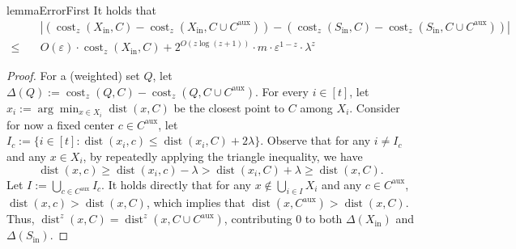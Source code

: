 \documentclass[letterpaper,11pt]{article}
\theoremstyle{plain}
\theoremstyle{definition}
\theoremstyle{remark}
\DeclareMathOperator{\cost}{cost}
\DeclareMathOperator{\dist}{dist}
\newcommand{\inl}{\mathrm{in}}
\newcommand{\eps}{\varepsilon}
\newcommand{\aux}{\mathrm{aux}}
\begin{document}
\begin{restatable}{lemma}{ErrorFirst}
    \label{lem:error first}
    It holds that 
    \begin{align*}
        &\quad \left|\left(\cost_z(X_\inl,C) - \cost_z(X_\inl,C\cup C^\aux) \right) - \left(\cost_z(S_\inl,C) - \cost_z(S_\inl,C\cup C^\aux) \right)  \right|\\
        \le&\quad O(\eps)\cdot \cost_z(X_\inl,C) + 2^{O(z\log (z+1))}\cdot m\cdot \eps^{1-z}\cdot \lambda^z
    \end{align*}
\end{restatable}
\begin{proof}
    For a (weighted) set $Q$, let $\Delta(Q):=\cost_z(Q,C) - \cost_z(Q,C\cup C^\aux)$.
    For every $i\in [t]$, let $x_i:=\arg\min_{x\in X_i}\dist(x,C)$ be the closest point to $C$ among $X_i$. Consider for now a fixed center $c\in C^\aux$, let $I_c:=\{i\in [t]: \dist(x_i,c)\le \dist(x_i,C) + 2\lambda\}$. Observe that for any $i\neq I_c$ and any $x\in X_i$, by repeatedly applying the triangle inequality, we have 
    \begin{equation}
        \dist(x,c)\ge \dist(x_i,c) - \lambda > \dist(x_i,C) + \lambda \ge \dist(x,C).
    \end{equation}
    Let $I:=\bigcup_{c\in C^\aux}I_c$. It holds directly that for any $x\not\in\bigcup_{i\in I} X_i$ and any $c\in C^\aux$, $\dist(x,c) > \dist(x,C)$, which implies that $\dist(x,C^\aux)> \dist(x,C)$. Thus, $\dist^z(x,C) = \dist^z(x,C\cup C^\aux)$, contributing $0$ to both $\Delta(X_\inl)$ and $\Delta(S_\inl)$. 
    

\end{proof}
\end{document}
